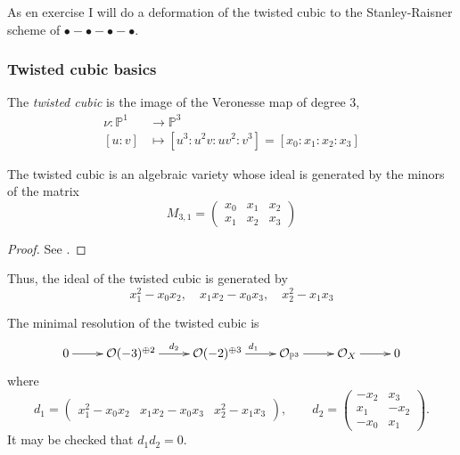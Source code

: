As en exercise I will do a deformation of the twisted cubic to the
Stanley-Raisner scheme of $\bullet-\bullet-\bullet-\bullet$.

\subsubsection{Twisted cubic basics}
\label{subsubsection-twisted-cubic-basics}

\begin{definition}
\label{definition-twisted-cubic}
The {\it twisted cubic} is the image of the Veronesse map of degree 3,
\begin{align*}
\nu: \mathbb{P}^1 &\longrightarrow \mathbb{P}^3 \\
[u:v] &\longmapsto [u^3:u^2v:uv^2:v^3]=[x_0:x_1:x_2:x_3]
\end{align*}
\end{definition}

\begin{lemma}
\label{lemma-twisted-cubic-is-variety}
\begin{reference}
\cite[Proposition 6.1]{sys}
\end{reference}
The twisted cubic is an algebraic variety whose ideal is generated by the minors
of the matrix
$$
M_{3,1}=\begin{pmatrix}
x_0 & x_1 & x_2\\
x_1 & x_2 & x_3
\end{pmatrix}
$$
\end{lemma}

\begin{proof}
See \cite[Proposition 6.1]{sys}.
\end{proof}

Thus, the ideal of the twisted cubic is generated by
\begin{equation}
\label{equation-twisted-cubic1}
x_1^2-x_0x_2,\quad x_1x_2-x_0x_3,\quad x_2^2-x_1x_3
\end{equation}

The minimal resolution of the twisted cubic is
\begin{equation}
\label{equation-resolution-of-twisted-cubic}
\xymatrix{
0\ar[r]&\mathcal{O}(-3)^{\oplus 2}\ar[r]^{d_2}&
\mathcal{O}(-2)^{\oplus 3}\ar[r]^{d_1}&
\mathcal{O}_{\mathbb{P}^3}\ar[r]&\mathcal{O}_X\ar[r]&0
}
\end{equation}
where
\begin{equation*}
\label{equation-matrices-twisted-cubic}
d_1=\begin{pmatrix}
x_1^2-x_0x_2&x_1x_2-x_0x_3&x_2^2-x_1x_3
\end{pmatrix},\qquad 
d_2=\begin{pmatrix}
-x_2&x_3\\
x_1&-x_2\\
-x_0&x_1
\end{pmatrix}.
\end{equation*}
It may be checked that $d_1d_2=0$.

